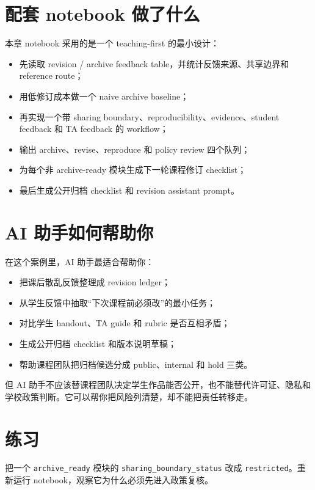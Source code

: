 \section{配套 notebook 做了什么}

本章 notebook 采用的是一个 teaching-first 的最小设计：

\begin{itemize}
    \item 先读取 revision / archive feedback table，并统计反馈来源、共享边界和 reference route；
    \item 用低修订成本做一个 naive archive baseline；
    \item 再实现一个带 sharing boundary、reproducibility、evidence、student feedback 和 TA feedback 的 workflow；
    \item 输出 archive、revise、reproduce 和 policy review 四个队列；
    \item 为每个非 archive-ready 模块生成下一轮课程修订 checklist；
    \item 最后生成公开归档 checklist 和 revision assistant prompt。
\end{itemize}

\section{AI 助手如何帮助你}

在这个案例里，AI 助手最适合帮助你：

\begin{itemize}
    \item 把课后散乱反馈整理成 revision ledger；
    \item 从学生反馈中抽取“下次课程前必须改”的最小任务；
    \item 对比学生 handout、TA guide 和 rubric 是否互相矛盾；
    \item 生成公开归档 checklist 和版本说明草稿；
    \item 帮助课程团队把归档候选分成 public、internal 和 hold 三类。
\end{itemize}

但 AI 助手不应该替课程团队决定学生作品能否公开，也不能替代许可证、隐私和学校政策判断。它可以帮你把风险列清楚，却不能把责任转移走。

\section{练习}

\begin{exercisebox}[基础练习]
把一个 \texttt{archive\_ready} 模块的 \texttt{sharing\_boundary\_status} 改成 \texttt{restricted}。重新运行 notebook，观察它为什么必须先进入政策复核。
\end{exercisebox}

